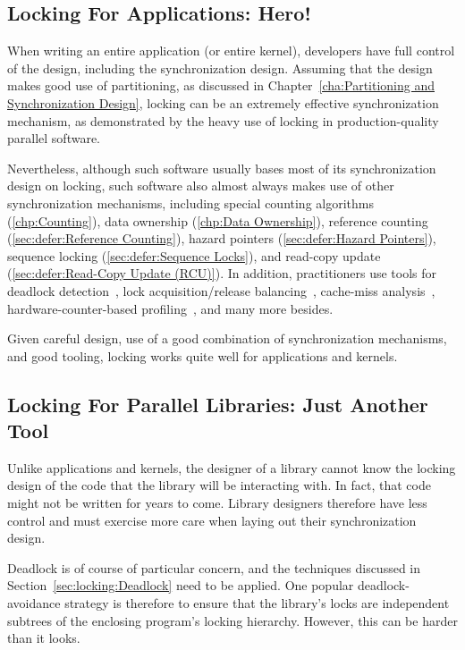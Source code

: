\subsection{Locking For Applications: Hero!}
\label{sec:locking:Locking For Applications: Hero!}

When writing an entire application (or entire kernel), developers have
full control of the design, including the synchronization design.
Assuming that the design makes good use of partitioning, as discussed in
Chapter~\ref{cha:Partitioning and Synchronization Design}, locking
can be an extremely effective synchronization mechanism, as demonstrated
by the heavy use of locking in production-quality parallel software.

Nevertheless, although such software usually bases most of its
synchronization design on locking, such software also almost always
makes use of other synchronization mechanisms, including
special counting algorithms (\cref{chp:Counting}),
data ownership (\cref{chp:Data Ownership}),
reference counting (\cref{sec:defer:Reference Counting}),
hazard pointers (\cref{sec:defer:Hazard Pointers}),
sequence locking (\cref{sec:defer:Sequence Locks}), and
read-copy update (\cref{sec:defer:Read-Copy Update (RCU)}).
In addition, practitioners use tools for deadlock
detection~\cite{JonathanCorbet2006lockdep},
lock acquisition/release balancing~\cite{JonathanCorbet2004sparse},
cache-miss analysis~\cite{ValgrindHomePage},
hardware-counter-based profiling~\cite{LinuxKernelPerfWiki,OProfileHomePage},
and many more besides.

Given careful design, use of a good combination of synchronization
mechanisms, and good tooling, locking works quite well for applications
and kernels.

\subsection{Locking For Parallel Libraries: Just Another Tool}
\label{sec:locking:Locking For Parallel Libraries: Just Another Tool}

Unlike applications and kernels, the designer of a library cannot
know the locking design of the code that the library will be interacting
with.
In fact, that code might not be written for years to come.
Library designers therefore have less control and must exercise more
care when laying out their synchronization design.

Deadlock is of course of particular concern, and the techniques discussed
in Section~\ref{sec:locking:Deadlock} need to be applied.
One popular deadlock-avoidance strategy is therefore to ensure that
the library's locks are independent subtrees of the enclosing program's
locking hierarchy.
However, this can be harder than it looks.

